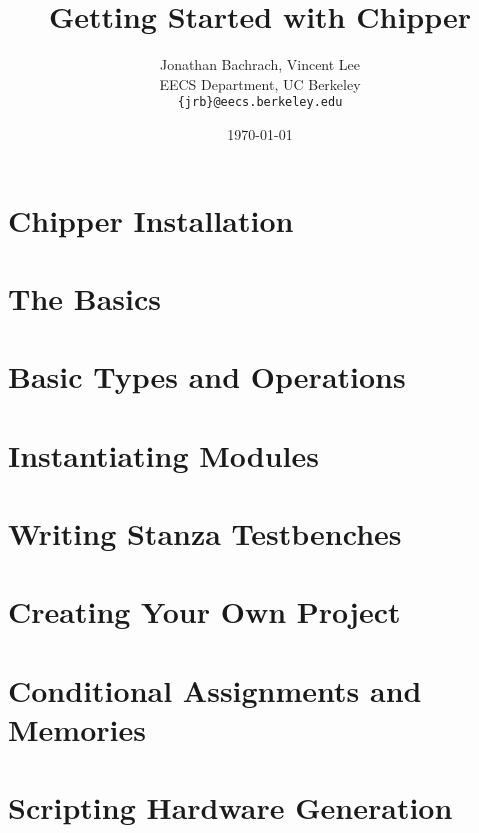 \documentclass[twocolumn, 10pt]{book}
\title{Getting Started with Chipper}
\author{Jonathan Bachrach, Vincent Lee \\
EECS Department, UC Berkeley\\
{\tt  \{jrb\}@eecs.berkeley.edu}
}
\date{\today}
\begin{document}
\maketitle{}

\chapter{Chipper Installation}


\chapter{The Basics}


\chapter{Basic Types and Operations}


\chapter{Instantiating Modules}


\chapter{Writing Stanza Testbenches}


\chapter{Creating Your Own Project}


\chapter{Conditional Assignments and Memories}


\chapter{Scripting Hardware Generation}

\end{document}
